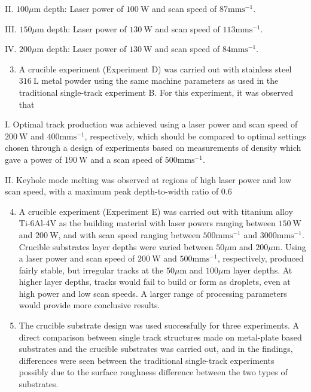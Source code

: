 \documentclass[10pt]{article}
\begin{document}
II. $100 \mu \mathrm{m}$ depth: Laser power of $100 \mathrm{~W}$ and scan speed of $87 \mathrm{mms}^{-1}$.

III. $150 \mu \mathrm{m}$ depth: Laser power of $130 \mathrm{~W}$ and scan speed of $113 \mathrm{mms}^{-1}$.

IV. $200 \mu \mathrm{m}$ depth: Laser power of $130 \mathrm{~W}$ and scan speed of $84 \mathrm{mms}^{-1}$.

\begin{enumerate}
  \setcounter{enumi}{2}
  \item A crucible experiment (Experiment D) was carried out with stainless steel $316 \mathrm{~L}$ metal powder using the same machine parameters as used in the traditional single-track experiment B. For this experiment, it was observed that
\end{enumerate}

I. Optimal track production was achieved using a laser power and scan speed of $200 \mathrm{~W}$ and $400 \mathrm{mms}^{-1}$, respectively, which should be compared to optimal settings chosen through a design of experiments based on measurements of density which gave a power of $190 \mathrm{~W}$ and a scan speed of $500 \mathrm{mms}^{-1}$.

II. Keyhole mode melting was observed at regions of high laser power and low scan speed, with a maximum peak depth-to-width ratio of 0.6

\begin{enumerate}
  \setcounter{enumi}{3}
  \item A crucible experiment (Experiment E) was carried out with titanium alloy Ti-6Al-4V as the building material with laser powers ranging between $150 \mathrm{~W}$ and $200 \mathrm{~W}$, and with scan speed ranging between $500 \mathrm{mms}^{-1}$ and $3000 \mathrm{mms}^{-1}$. Crucible substrates layer depths were varied between $50 \mu \mathrm{m}$ and $200 \mu \mathrm{m}$. Using a laser power and scan speed of $200 \mathrm{~W}$ and $500 \mathrm{mms}^{-1}$, respectively, produced fairly stable, but irregular tracks at the $50 \mu \mathrm{m}$ and $100 \mu \mathrm{m}$ layer depths. At higher layer depths, tracks would fail to build or form as droplets, even at high power and low scan speeds. A larger range of processing parameters would provide more conclusive results.

  \item The crucible substrate design was used successfully for three experiments. A direct comparison between single track structures made on metal-plate based substrates and the crucible substrates was carried out, and in the findings, differences were seen between the traditional single-track experiments possibly due to the surface roughness difference between the two types of substrates.

\end{enumerate}
\end{document}
